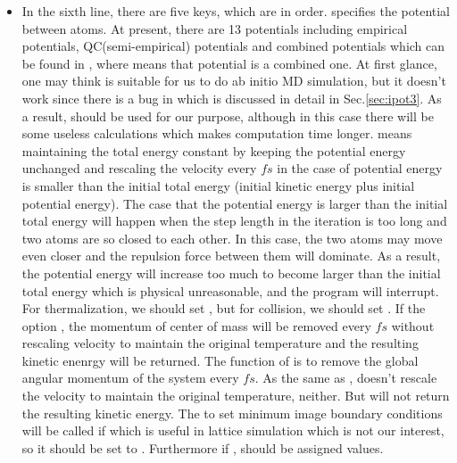 \documentclass[11pt]{JHEP3}
\begin{document}
\begin{itemize}
\item In the sixth line, there are five keys, which are  in order.  specifies the potential between atoms. At
present, there are 13 potentials including empirical potentials,
QC(semi-empirical) potentials and combined potentials which can be
found in ,  where
 means that potential is a combined one. At first
glance, one may think  is suitable for us to do ab
initio MD simulation, but it doesn't work since there is a bug in
 which is discussed in detail in Sec.\ref{sec:ipot3}.
As a result,  should be used for our purpose,
although in this case there will be some useless calculations which
makes computation time longer.  means maintaining the
total energy constant by keeping the potential energy unchanged and
rescaling the velocity every  $fs$ in the case of
potential energy is smaller than the initial total energy (initial
kinetic energy plus initial potential energy). The case that the
potential energy is larger than the initial total energy will happen
when the step length in the iteration is too long and two atoms are
so closed to each other. In this case, the two atoms may move even
closer and the repulsion force between them will dominate. As a
result, the potential energy will increase too much to become larger
than the initial total energy which is physical unreasonable, and
the program will interrupt. For thermalization, we should set
, but for collision, we should set .
If the option , the momentum of center of mass will
be removed every  $fs$ without rescaling velocity to
maintain the original temperature and the resulting kinetic enenrgy
 will be returned. The function of  is to
remove the global angular momentum of the system every 
$fs$. As the same as ,  doesn't rescale
the velocity to maintain the original temperature, neither. But
 will not return the resulting kinetic energy. The
 to set minimum image boundary conditions
will be called if  which is useful in lattice
simulation which is not our interest, so it should be set to
. Furthermore if ,  should
be assigned values.


\end{itemize}
\end{document}
